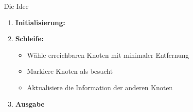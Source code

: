 \begin{frame}{Die Idee}
	\begin{enumerate}
		\item \textbf{Initialisierung:}
		\item \textbf{Schleife:} 
			\begin{itemize}
				\item Wähle erreichbaren Knoten mit minimaler Entfernung
				\item Markiere Knoten als besucht
				\item Aktualisiere die Information der anderen Knoten
			\end{itemize}
		\item \textbf{Ausgabe}
	\end{enumerate}

\end{frame}


